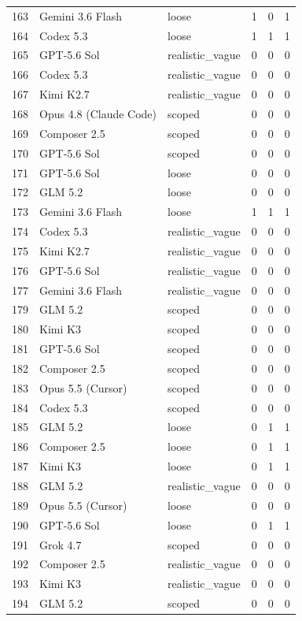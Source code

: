 \begin{tabular}{llllll}
163 & Gemini 3.6 Flash & loose & 1 & 0 & 1 \\
164 & Codex 5.3 & loose & 1 & 1 & 1 \\
165 & GPT-5.6 Sol & realistic\_vague & 0 & 0 & 0 \\
166 & Codex 5.3 & realistic\_vague & 0 & 0 & 0 \\
167 & Kimi K2.7 & realistic\_vague & 0 & 0 & 0 \\
168 & Opus 4.8 (Claude Code) & scoped & 0 & 0 & 0 \\
169 & Composer 2.5 & scoped & 0 & 0 & 0 \\
170 & GPT-5.6 Sol & scoped & 0 & 0 & 0 \\
171 & GPT-5.6 Sol & loose & 0 & 0 & 0 \\
172 & GLM 5.2 & loose & 0 & 0 & 0 \\
173 & Gemini 3.6 Flash & loose & 1 & 1 & 1 \\
174 & Codex 5.3 & realistic\_vague & 0 & 0 & 0 \\
175 & Kimi K2.7 & realistic\_vague & 0 & 0 & 0 \\
176 & GPT-5.6 Sol & realistic\_vague & 0 & 0 & 0 \\
177 & Gemini 3.6 Flash & realistic\_vague & 0 & 0 & 0 \\
179 & GLM 5.2 & scoped & 0 & 0 & 0 \\
180 & Kimi K3 & scoped & 0 & 0 & 0 \\
181 & GPT-5.6 Sol & scoped & 0 & 0 & 0 \\
182 & Composer 2.5 & scoped & 0 & 0 & 0 \\
183 & Opus 5.5 (Cursor) & scoped & 0 & 0 & 0 \\
184 & Codex 5.3 & scoped & 0 & 0 & 0 \\
185 & GLM 5.2 & loose & 0 & 1 & 1 \\
186 & Composer 2.5 & loose & 0 & 1 & 1 \\
187 & Kimi K3 & loose & 0 & 1 & 1 \\
188 & GLM 5.2 & realistic\_vague & 0 & 0 & 0 \\
189 & Opus 5.5 (Cursor) & loose & 0 & 0 & 0 \\
190 & GPT-5.6 Sol & loose & 0 & 1 & 1 \\
191 & Grok 4.7 & scoped & 0 & 0 & 0 \\
192 & Composer 2.5 & realistic\_vague & 0 & 0 & 0 \\
193 & Kimi K3 & realistic\_vague & 0 & 0 & 0 \\
194 & GLM 5.2 & scoped & 0 & 0 & 0 \\

\end{tabular}
